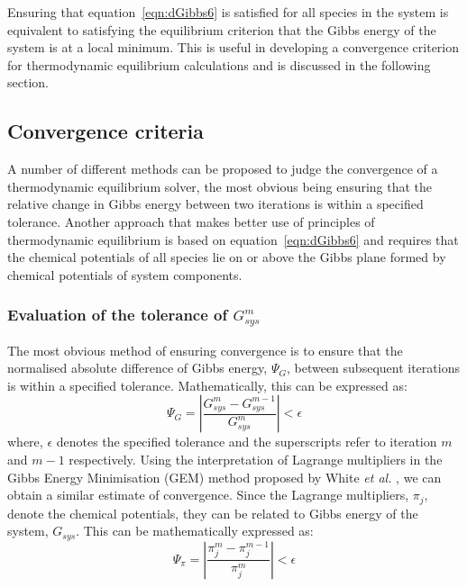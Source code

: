 		Ensuring that equation~\ref{eqn:dGibbs6} is satisfied for all species in the system is equivalent to satisfying the equilibrium criterion that the Gibbs energy of the system is at a local minimum. This is useful in developing a convergence criterion for thermodynamic equilibrium calculations and is discussed in the following section.
		
	\subsection{Convergence criteria}
	A number of different methods can be proposed to judge the convergence of a thermodynamic equilibrium solver, the most obvious being ensuring that the relative change in Gibbs energy between two iterations is within a specified tolerance. Another approach that makes better use of principles of thermodynamic equilibrium is based on equation~\ref{eqn:dGibbs6} and requires that the chemical potentials of all species lie on or above the Gibbs plane formed by chemical potentials of system components.  
		\subsubsection{Evaluation of the tolerance of $G_{sys}^m$}
		The most obvious method of ensuring convergence is to ensure that the normalised absolute difference of Gibbs energy, $\Psi_G$, between subsequent iterations is within a specified tolerance. Mathematically, this can be expressed as:
		\begin{equation}\label{eqn:conv1}
			\Psi_G = \left \vert \frac{G_{sys}^{m} - G_{sys}^{m-1}}{G_{sys}^{m}} \right \vert < \epsilon
		\end{equation}
		where, $\epsilon$ denotes the specified tolerance and the superscripts refer to iteration $m$ and $m-1$ respectively. Using the interpretation of Lagrange multipliers in the Gibbs Energy Minimisation (GEM) method proposed by White \textit{et al.} \cite{White58a}, we can obtain a similar estimate of convergence. Since the Lagrange multipliers, $\pi_{j}$, denote the chemical potentials, they can be related to Gibbs energy of the system, $G_{sys}$. This can be mathematically expressed as:
		\begin{equation}\label{eqn:conv2}
			\Psi_{\pi} = \left \vert \frac{\pi_{j}^{m} - \pi_{j}^{m-1}}{\pi_{j}^{m}} \right \vert < \epsilon
		\end{equation}
		
